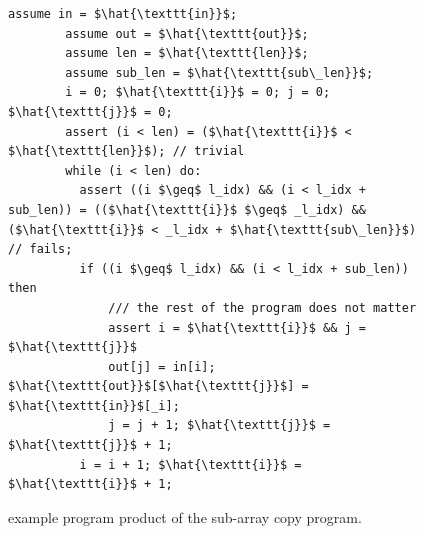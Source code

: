 \begin{figure}[h]
    \begin{lstlisting}[language=MySketch]
        assume in = $\hat{\texttt{in}}$;
        assume out = $\hat{\texttt{out}}$;
        assume len = $\hat{\texttt{len}}$;
        assume sub_len = $\hat{\texttt{sub\_len}}$;
        i = 0; $\hat{\texttt{i}}$ = 0; j = 0; $\hat{\texttt{j}}$ = 0;
        assert (i < len) = ($\hat{\texttt{i}}$ < $\hat{\texttt{len}}$); // trivial
        while (i < len) do:
          assert ((i $\geq$ l_idx) && (i < l_idx + sub_len)) = (($\hat{\texttt{i}}$ $\geq$ _l_idx) && ($\hat{\texttt{i}}$ < _l_idx + $\hat{\texttt{sub\_len}}$) // fails;
          if ((i $\geq$ l_idx) && (i < l_idx + sub_len)) then
              /// the rest of the program does not matter
              assert i = $\hat{\texttt{i}}$ && j = $\hat{\texttt{j}}$
              out[j] = in[i]; $\hat{\texttt{out}}$[$\hat{\texttt{j}}$] = $\hat{\texttt{in}}$[_i];
              j = j + 1; $\hat{\texttt{j}}$ = $\hat{\texttt{j}}$ + 1;
          i = i + 1; $\hat{\texttt{i}}$ = $\hat{\texttt{i}}$ + 1;
      \end{lstlisting}
      \caption{example program product of the sub-array copy program.}
      \label{fig:example_prod}
\end{figure}


